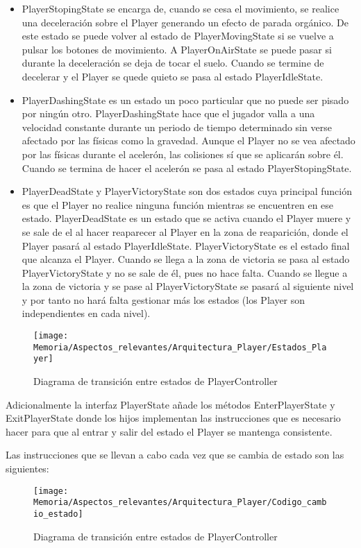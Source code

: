 \begin{itemize}
\item
PlayerStopingState se encarga de, cuando se cesa el movimiento, se realice una deceleración sobre el Player generando un efecto de parada orgánico. De este estado se puede volver al estado de PlayerMovingState si se vuelve a pulsar los botones de movimiento. A PlayerOnAirState se puede pasar si durante la deceleración se deja de tocar el suelo. Cuando se termine de decelerar y el Player se quede quieto se pasa al estado PlayerIdleState.
\item
PlayerDashingState es un estado un poco particular que no puede ser pisado por ningún otro. PlayerDashingState hace que el jugador valla a una velocidad constante durante un periodo de tiempo determinado sin verse afectado por las físicas como la gravedad. Aunque el Player no se vea afectado por las físicas durante el acelerón, las colisiones sí que se aplicarán sobre él. Cuando se termina de hacer el acelerón se pasa al estado PlayerStopingState.
\item
PlayerDeadState y PlayerVictoryState son dos estados cuya principal función es que el Player no realice ninguna función mientras se encuentren en ese estado. PlayerDeadState es un estado que se activa cuando el Player muere y se sale de el al hacer reaparecer al Player en la zona de reaparición, donde el Player pasará al estado PlayerIdleState. PlayerVictoryState es el estado final que alcanza el Player. Cuando se llega a la zona de victoria se pasa al estado PlayerVictoryState y no se sale de él, pues no hace falta. Cuando se llegue a la zona de victoria y se pase al PlayerVictoryState se pasará al siguiente nivel y por tanto no hará falta gestionar más los estados (los Player son independientes en cada nivel).
\end{itemize}

\begin{figure}[h]
\centering
\texttt{[image: Memoria/Aspectos\_relevantes/Arquitectura\_Player/Estados\_Player]}
\caption{Diagrama de transición entre estados de PlayerController}
\end{figure}

Adicionalmente la interfaz PlayerState añade los métodos EnterPlayerState y ExitPlayerState donde los hijos implementan las instrucciones que es necesario hacer para que al entrar y salir del estado el Player se mantenga consistente.

Las instrucciones que se llevan a cabo cada vez que se cambia de estado son las siguientes:

\begin{figure}[h]
\centering
\texttt{[image: Memoria/Aspectos\_relevantes/Arquitectura\_Player/Codigo\_cambio\_estado]}
\caption{Diagrama de transición entre estados de PlayerController}
\end{figure}

